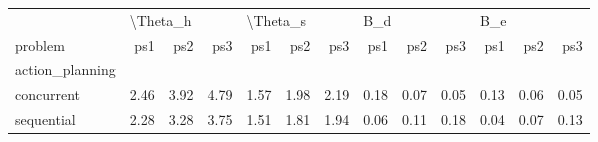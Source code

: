 \begin{tabular}{lrrrrrrrrrrrr}
\toprule
{} & \multicolumn{3}{l}{\textbackslash Theta\_h} & \multicolumn{3}{l}{\textbackslash Theta\_s} & \multicolumn{3}{l}{B\_d} & \multicolumn{3}{l}{B\_e} \\
problem &      ps1 &  ps2 &  ps3 &      ps1 &  ps2 &  ps3 &  ps1 &  ps2 &  ps3 &  ps1 &  ps2 &  ps3 \\
action\_planning &          &      &      &          &      &      &      &      &      &      &      &      \\
\midrule
concurrent      &     2.46 & 3.92 & 4.79 &     1.57 & 1.98 & 2.19 & 0.18 & 0.07 & 0.05 & 0.13 & 0.06 & 0.05 \\
sequential      &     2.28 & 3.28 & 3.75 &     1.51 & 1.81 & 1.94 & 0.06 & 0.11 & 0.18 & 0.04 & 0.07 & 0.13 \\
\bottomrule
\end{tabular}
